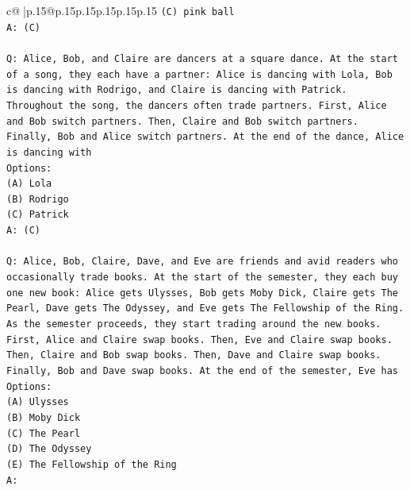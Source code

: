 \documentclass{article}
\begin{document}
{\begin{supertabular}{c@{$\;$}|p{.15\linewidth}@{}p{.15\linewidth}p{.15\linewidth}p{.15\linewidth}p{.15\linewidth}p{.15\linewidth}}
{{{\texttt{(C) pink ball} \\
\texttt{A: (C)} \\
\\ 
\texttt{Q: Alice, Bob, and Claire are dancers at a square dance. At the start of a song, they each have a partner: Alice is dancing with Lola, Bob is dancing with Rodrigo, and Claire is dancing with Patrick.} \\
\texttt{Throughout the song, the dancers often trade partners. First, Alice and Bob switch partners. Then, Claire and Bob switch partners. Finally, Bob and Alice switch partners. At the end of the dance, Alice is dancing with} \\
\texttt{Options:} \\
\texttt{(A) Lola} \\
\texttt{(B) Rodrigo} \\
\texttt{(C) Patrick} \\
\texttt{A: (C)} \\
\\ 
\texttt{Q: Alice, Bob, Claire, Dave, and Eve are friends and avid readers who occasionally trade books. At the start of the semester, they each buy one new book: Alice gets Ulysses, Bob gets Moby Dick, Claire gets The Pearl, Dave gets The Odyssey, and Eve gets The Fellowship of the Ring.} \\
\texttt{As the semester proceeds, they start trading around the new books. First, Alice and Claire swap books. Then, Eve and Claire swap books. Then, Claire and Bob swap books. Then, Dave and Claire swap books. Finally, Bob and Dave swap books. At the end of the semester, Eve has} \\
\texttt{Options:} \\
\texttt{(A) Ulysses} \\
\texttt{(B) Moby Dick} \\
\texttt{(C) The Pearl} \\
\texttt{(D) The Odyssey} \\
\texttt{(E) The Fellowship of the Ring} \\
\texttt{A:} \\
            }
        }
    }
     \\ \\


\end{supertabular}}
\end{document}

